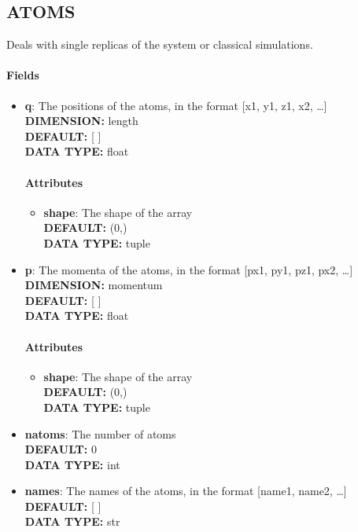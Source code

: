 \subsection{ATOMS}
\label{ATOMS}
Deals with single replicas of the system or classical simulations.
\paragraph{Fields}
 \begin{itemize}
\item {\bf q}:
 The positions of the atoms, in the format [x1, y1, z1, x2, \ldots  ]
{\\ \bf DIMENSION: }length
{\\ \bf DEFAULT: }[ ]
{\\ \bf DATA TYPE: }float
\paragraph{Attributes}
 \begin{itemize}
\item {\bf shape}:
 The shape of the array
{\\ \bf DEFAULT: }(0,)
{\\ \bf DATA TYPE: }tuple
\end{itemize}
 
\item {\bf p}:
 The momenta of the atoms, in the format [px1, py1, pz1, px2, \ldots  ]
{\\ \bf DIMENSION: }momentum
{\\ \bf DEFAULT: }[ ]
{\\ \bf DATA TYPE: }float
\paragraph{Attributes}
 \begin{itemize}
\item {\bf shape}:
 The shape of the array
{\\ \bf DEFAULT: }(0,)
{\\ \bf DATA TYPE: }tuple
\end{itemize}
 
\item {\bf natoms}:
 The number of atoms
{\\ \bf DEFAULT: }0
{\\ \bf DATA TYPE: }int
\item {\bf names}:
 The names of the atoms, in the format [name1, name2, \ldots  ]
{\\ \bf DEFAULT: }[ ]
{\\ \bf DATA TYPE: }str

\end{itemize}
